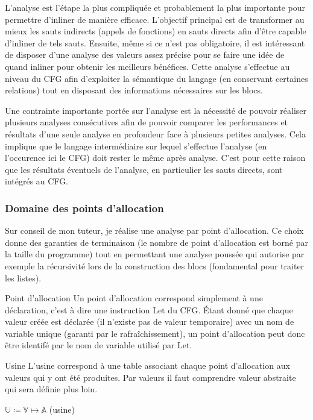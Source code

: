\documentclass{beamer}
\begin{document}
L'analyse est l'étape la plus compliquée et probablement la plus importante pour permettre d'inliner de manière efficace. L'objectif principal est de transformer au mieux les sauts indirects (appels de fonctions) en sauts directs afin d'être capable d'inliner de tels sauts. Ensuite, même si ce n'est pas obligatoire, il est intéressant de disposer d'une analyse des valeurs assez précise pour se faire une idée de quand inliner pour obtenir les meilleurs bénéfices. Cette analyse s'effectue au niveau du CFG afin d'exploiter la sémantique du langage (en conservant certaines relations) tout en disposant des informations nécessaires sur les blocs.

Une contrainte importante portée sur l'analyse est la nécessité de pouvoir réaliser plusieurs analyses consécutives afin de pouvoir comparer les performances et résultats d'une seule analyse en profondeur face à plusieurs petites analyses. Cela implique que le langage intermédiaire sur lequel s'effectue l'analyse (en l'occurence ici le CFG) doit rester le même après analyse. C'est pour cette raison que les résultats éventuels de l'analyse, en particulier les sauts directs, sont intégrés au CFG.

\subsubsection{Domaine des points d'allocation}

Sur conseil de mon tuteur, je réalise une analyse par point d'allocation. Ce choix donne des garanties de terminaison (le nombre de point d'allocation est borné par la taille du programme) tout en permettant une analyse poussée qui autorise par exemple la récursivité lors de la construction des blocs (fondamental pour traiter les listes).

\begin{frame}{Point d'allocation}
    Un point d'allocation correspond simplement à une déclaration, c'est à dire une instruction $\text{Let}$ du CFG. Étant donné que chaque valeur créée est déclarée (il n'existe pas de valeur temporaire) avec un nom de variable unique (garanti par le rafraîchissement), un point d'allocation peut donc être identifé par le nom de variable utilisé par $\text{Let}$. 
\end{frame}

\begin{frame}{Usine}
    L'usine correspond à une table associant chaque point d'allocation aux valeurs qui y ont été produites. Par valeurs il faut comprendre valeur abstraite qui sera définie plus loin.

    $\mathbb{U} \coloneqq \mathbb{V} \mapsto \mathbb{A}$ (usine)
\end{frame}
\end{document}
